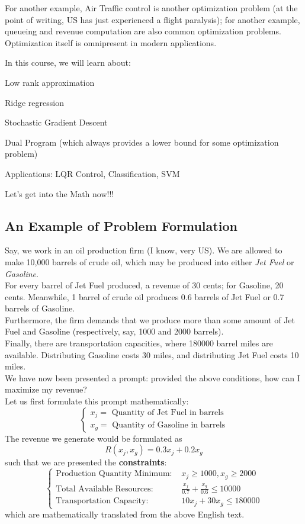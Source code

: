 For another example, Air Traffic control is another optimization problem (at the point of writing, US has just experienced a flight paralysis); for another example, queueing and revenue computation are also common optimization problems.
Optimization itself is omnipresent in modern applications.

In this course, we will learn about:
\begin{bindenum}
    \item Low rank approximation
    \item Ridge regression
    \item Stochastic Gradient Descent
    \item Dual Program (which always provides a lower bound for some optimization problem)
    \item Applications: LQR Control, Classification, SVM
\end{bindenum}

Let's get into the Math now!!!

\subsection{An Example of Problem Formulation}
Say, we work in an oil production firm (I know, very US).
We are allowed to make 10,000 barrels of crude oil, which may be produced into either \textit{Jet Fuel} or \textit{Gasoline}. \\
For every barrel of Jet Fuel produced, a revenue of 30 cents; for Gasoline, 20 cents. Meanwhile, 1 barrel of crude oil produces 0.6 barrels of Jet Fuel or 0.7 barrels of Gasoline. \\
Furthermore, the firm demands that we produce more than some amount of Jet Fuel and Gasoline (respectively, say, 1000 and 2000 barrels). \\
Finally, there are transportation capacities, where 180000 barrel miles are available. Distributing Gasoline costs 30 miles, and distributing Jet Fuel costs 10 miles. \\

We have now been presented a prompt: provided the above conditions, how can I maximize my revenue? \\
Let us first formulate this prompt mathematically:
\[
    \begin{cases}
        x_j = \text{ Quantity of Jet Fuel in barrels} \\
        x_g = \text{ Quantity of Gasoline in barrels}
    \end{cases}
\]
The revenue we generate would be formulated as
\[R(x_j, x_g) = 0.3 x_j + 0.2 x_g\]
such that we are presented the \textbf{constraints}:
\[
    \begin{cases}
        \text{Production Quantity Minimum: } &x_j \geq 1000, x_g \geq 2000 \\
        \text{Total Available Resources: } &\frac{x_j}{0.7} + \frac{x_g}{0.6} \leq 10000 \\
        \text{Transportation Capacity: } &10 x_j + 30 x_g \leq 180000
    \end{cases}
\]
which are mathematically translated from the above English text.

